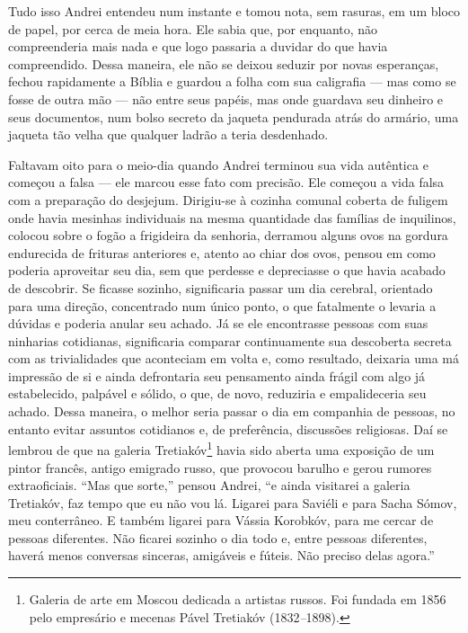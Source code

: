 Tudo isso Andrei entendeu num instante e tomou nota, sem rasuras, em um
bloco de papel, por cerca de meia hora. Ele sabia que, por enquanto, não
compreenderia mais nada e que logo passaria a duvidar do que havia
compreendido. Dessa maneira, ele não se deixou seduzir por novas
esperanças, fechou rapidamente a Bíblia e guardou a folha com sua
caligrafia --- mas como se fosse de outra mão --- não entre seus papéis,
mas onde guardava seu dinheiro e seus documentos, num bolso secreto da
jaqueta pendurada atrás do armário, uma jaqueta tão velha que qualquer
ladrão a teria desdenhado.

Faltavam oito para o meio-dia quando Andrei terminou sua vida autêntica
e começou a falsa --- ele marcou esse fato com precisão. Ele começou a
vida falsa com a preparação do desjejum. Dirigiu-se à cozinha comunal
coberta de fuligem onde havia mesinhas individuais na mesma quantidade
das famílias de inquilinos, colocou sobre o fogão a frigideira da
senhoria, derramou alguns ovos na gordura endurecida de frituras
anteriores e, atento ao chiar dos ovos, pensou em como poderia
aproveitar seu dia, sem que perdesse e depreciasse o que havia acabado
de descobrir. Se ficasse sozinho, significaria passar um dia cerebral,
orientado para uma direção, concentrado num único ponto, o que
fatalmente o levaria a dúvidas e poderia anular seu achado. Já se ele
encontrasse pessoas com suas ninharias cotidianas, significaria comparar
continuamente sua descoberta secreta com as trivialidades que aconteciam
em volta e, como resultado, deixaria uma má impressão de si e ainda
defrontaria seu pensamento ainda frágil com algo já estabelecido,
palpável e sólido, o que, de novo, reduziria e empalideceria seu achado.
Dessa maneira, o melhor seria passar o dia em companhia de pessoas, no
entanto evitar assuntos cotidianos e, de preferência, discussões
religiosas. Daí se lembrou de que na galeria Tretiakóv\footnote{Galeria
  de arte em Moscou dedicada a artistas russos. Foi fundada em 1856 pelo
  empresário e mecenas Pável Tretiakóv (1832\emph{--}1898).} havia sido
aberta uma exposição de um pintor francês, antigo emigrado russo, que
provocou barulho e gerou rumores extraoficiais. ``Mas que sorte,''
pensou Andrei, ``e ainda visitarei a galeria Tretiakóv, faz tempo que eu
não vou lá. Ligarei para Saviéli e para Sacha Sómov, meu conterrâneo. E
também ligarei para Vássia Korobkóv, para me cercar de pessoas
diferentes. Não ficarei sozinho o dia todo e, entre pessoas diferentes,
haverá menos conversas sinceras, amigáveis e fúteis. Não preciso delas
agora.''

